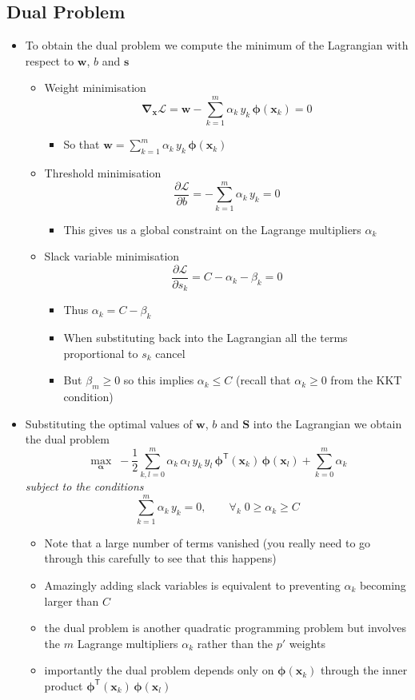 \documentclass[11pt]{article}
\newcommand{\tr}{\textsf{T}}
\newcommand{\grad}{\bm{\nabla}}
\begin{document}
\subsection{Dual Problem}
\label{sec:org86b360f}
\begin{itemize}
\item To obtain the dual problem we compute the minimum of the
Lagrangian with respect to \(\bm{w}\), \(b\) and \(\bm{s}\)
\begin{itemize}
\item Weight minimisation
$$ \grad_{\bm{x}} \mathcal{L} = \bm{w} - \sum_{k=1}^m
       \alpha_k\,y_k\,\bm{\phi}(\bm{x}_k) = 0 $$
\begin{itemize}
\item So that \(\bm{w} = \sum\limits_{k=1}^m \alpha_k\,y_k\,\bm{\phi}(\bm{x}_k)\)
\end{itemize}
\item Threshold minimisation
$$ \frac{\partial \mathcal{L}}{\partial b} = -\sum_{k=1}^m
       \alpha_k\,y_k = 0 $$
\begin{itemize}
\item This gives us a global constraint on the Lagrange multipliers \(\alpha_k\)
\end{itemize}
\item Slack variable minimisation
$$ \frac{\partial \mathcal{L}}{\partial s_k} = C - \alpha_k
       -\beta_k = 0 $$
\begin{itemize}
\item Thus \(\alpha_k = C - \beta_k\)
\item When substituting back into the Lagrangian all the terms
proportional to \(s_k\) cancel
\item But \(\beta_m\geq0\) so this implies \(\alpha_k \leq C\) (recall
that \(\alpha_k\geq0\) from the KKT condition)
\end{itemize}
\end{itemize}
\item Substituting the optimal values of \(\bm{w}\), \(b\) and \(\bm{S}\)
into the Lagrangian we obtain the dual problem
$$ \max_{\bm{\alpha}}\;- \frac{1}{2} \sum_{k,l=0}^m
     \alpha_k\,\alpha_l \,
     y_k\,y_l\, \bm{\phi}^\tr(\bm{x}_k) \, \bm{\phi}(\bm{x}_l) +
     \sum_{k=0}^m \alpha_k$$
\hspace{6cm} \emph{subject to the conditions}
$$ \sum_{k=1}^m \alpha_k\, y_k=0, \quad \quad \forall_k  \; 0 \geq
     \alpha_k\geq C $$
\begin{itemize}
\item Note that a large number of terms vanished (you really need to
go through this carefully to see that this happens)
\item Amazingly adding slack variables is equivalent to preventing
\(\alpha_k\) becoming larger than \(C\)
\item the dual problem is another quadratic programming problem but
involves the \(m\) Lagrange multipliers \(\alpha_k\) rather than
the \(p'\) weights
\item importantly the dual problem depends only on
\(\bm{\phi}(\bm{x}_k)\) through the inner product
\(\bm{\phi}^\tr(\bm{x}_k) \, \bm{\phi}(\bm{x}_l)\)
\end{itemize}
\end{itemize}
\end{document}
